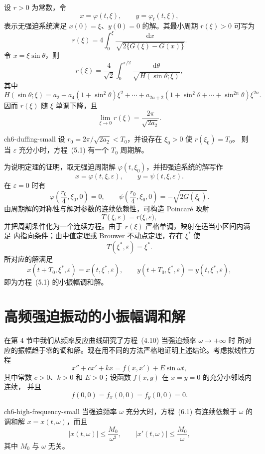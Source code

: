 设 $r>0$ 为常数，令
\[
  x=\varphi(t,\xi),\qquad y=\varphi_t(t,\xi), \tag{5.6}
\]
表示无强迫系统满足 $x(0)=\xi$、$y(0)=0$ 的解。其最小周期 $r(\xi)>0$ 可写为
\[
  r(\xi)=4\int_0^\xi\frac{\mathrm dx}{\sqrt{2\{G(\xi)-G(x)\}}}. \tag{5.7}
\]
令 $x=\xi\sin\theta$，则
\[
  r(\xi)=\frac4{\sqrt2}\int_0^{\pi/2}
  \frac{\mathrm d\theta}{\sqrt{H(\sin\theta;\xi)}},
\]
其中
\[
  H(\sin\theta;\xi)=a_2+a_4(1+\sin^2\theta)\xi^2+\cdots
  +a_{2n+2}(1+\sin^2\theta+\cdots+\sin^{2n}\theta)\xi^{2n}.
\]
因而 $r(\xi)$ 随 $\xi$ 单调下降，且
\[
  \lim_{\xi\to0}r(\xi)=\frac{2\pi}{\sqrt{2a_2}}.
\]

\begin{theorem}{}{ch6-duffing-small}
设 $r_0=2\pi/\sqrt{2a_2}<T_0$，并设存在 $\xi_0>0$ 使 $r(\xi_0)=T_0$。
则当 $\varepsilon$ 充分小时，方程~(5.1) 有一个 $T_0$ 周期解。
\end{theorem}

为说明定理的证明，取无强迫周期解 $\varphi(t,\xi_0)$，并把强迫系统的解写作
\[
  x=\varphi(t,\xi,\varepsilon),\qquad
  y=\psi(t,\xi,\varepsilon).
\]
在 $\varepsilon=0$ 时有
\[
  \varphi\left(\frac{r_0}{4},\xi_0,0\right)=0,\qquad
  \psi\left(\frac{r_0}{4},\xi_0,0\right)=-\sqrt{2G(\xi_0)}. \tag{5.8}
\]
由周期解的对称性与解对参数的连续依赖性，可构造 Poincar\'e 映射
\[
  T(\xi,\varepsilon)=r\bigl(\xi,\varepsilon\bigr),
\]
并把周期条件化为一个连续方程。由于 $r(\xi)$ 严格单调，映射在适当小区间内满足
内指向条件；由中值定理或 Brouwer 不动点定理，存在 $\xi^*$ 使
\[
  T(\xi^*,\varepsilon)=\xi^*.
\]
所对应的解满足
\[
  x(t+T_0,\xi^*,\varepsilon)=x(t,\xi^*,\varepsilon),\qquad
  y(t+T_0,\xi^*,\varepsilon)=y(t,\xi^*,\varepsilon), \tag{5.15}
\]
即为方程~(5.1) 的小振幅调和解。


\section{高频强迫振动的小振幅调和解}

在第 4 节中我们从频率反应曲线研究了方程~(4.10) 当强迫频率 $\omega\to+\infty$ 时
所对应的振幅趋于零的调和解。现在用不同的方法严格地证明上述结论。考虑拟线性方程
\[
  x''+cx'+kx=f(x,x')+E\sin\omega t, \tag{6.1}
\]
其中常数 $c>0$、$k>0$ 和 $E>0$；设函数 $f(x,y)$ 在 $x=y=0$ 的充分小邻域内连续，
并且
\[
  f(0,0)=f_x(0,0)=f_y(0,0)=0. \tag{6.2}
\]

\begin{theorem}{}{ch6-high-frequency-small}
当强迫频率 $\omega$ 充分大时，方程~(6.1) 有连续依赖于 $\omega$ 的调和解
$x=x(t,\omega)$，而且
\[
  |x(t,\omega)|\leq\frac{M_0}{\omega^2},\qquad
  |x'(t,\omega)|\leq\frac{M_0}{\omega}, \tag{6.3}
\]
其中 $M_0$ 与 $\omega$ 无关。
\end{theorem}

